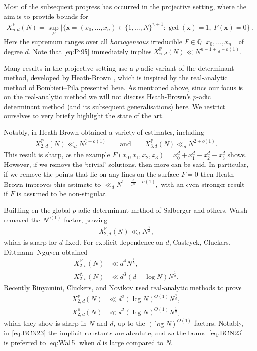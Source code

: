 \documentclass[12pt]{amsart}
\newcommand{\1}{{\mathbf 1}}
\theoremstyle{remark}
\theoremstyle{definition}
\begin{document}
Most of the subsequent progress has occurred in the projective setting, where the aim is to provide bounds for
\begin{align*}
X_{n,d}^{\mathbb{P}}(N) = \sup_{F}\lvert \{ \mathbf{x}=(x_0,\ldots,x_n)\in \{1,\ldots,N\}^{n+1} :  \gcd(\mathbf{x})=1, \ F(\mathbf{x})=0 \}\rvert.
\end{align*}
Here the supremum ranges over all \emph{homogeneous} irreducible $F\in \mathbb{Q}[x_0,\ldots,x_n]$ of degree $d$. Note that \eqref{eq:Pi95} immediately implies $X_{n,d}^{\mathbb{P}}(N) \ll N^{n-1+\frac{1}{d}+o(1)}$. 

Many results in the projective setting use a $p$-adic variant of the determinant method, developed by Heath-Brown \cite{HB02}, which is inspired by the real-analytic method of Bombieri--Pila presented here. As mentioned above, since our focus is on the real-analytic method we will not discuss Heath-Brown's $p$-adic determinant method (and its subsequent generalisations) here. We restrict ourselves to very briefly highlight the state of the art.


Notably, in \cite{HB02} Heath-Brown obtained a variety of estimates, including
\begin{align*}
X_{2,d}^{\mathbb{P}}(N) \ll_d N^{\frac{2}{d}+o(1)} 
\qquad \text{and}\qquad
X_{3,d}^{\mathbb{P}}(N) \ll_d N^{2+o(1)}.
\end{align*}
This result is sharp, as the example $F(x_0,x_1,x_2,x_3)=x_0^d+x_1^d-x_2^d-x_3^d$ shows. However, if we remove the `trivial' solutions, then more can be said. In particular, if we remove the points that lie on any lines on the surface $F=0$ then Heath-Brown improves this estimate to
$\ll_d N^{1+\frac{3}{\sqrt{d}}+o(1)},$
with an even stronger result if $F$ is assumed to be non-singular.



Building on the global $p$-adic determinant method of Salberger \cite{Sa23} and others, Walsh \cite{Wa15} removed the $N^{o(1)}$ factor, proving
\begin{align}\label{eq:Wa15}
X_{2,d}^{\mathbb{P}}(N) \ll_d N^{\frac{2}{d}},
\end{align}
which is sharp for $d$ fixed.
For explicit dependence on $d$, Castryck, Cluckers, Dittmann, Nguyen \cite{CCDN20} obtained
\begin{align}
X_{2,d}^{\mathbb{P}}(N) &\ll d^4 N^{\frac{2}{d}},\\
X_{2,d}^{\mathbb{A}}(N) &\ll d^3(d + \log N) N^{\frac{1}{d}} \nonumber.
\end{align}
Recently Binyamini, Cluckers, and Novikov \cite{BCN23} used real-analytic methods to prove
\begin{align}\label{eq:BCN23}
X_{2,d}^{\mathbb{P}}(N) &\ll d^2 (\log N)^{O(1)} N^{\frac{2}{d}},\\
X_{2,d}^{\mathbb{A}}(N) &\ll d^2 (\log N)^{O(1)} N^{\frac{1}{d}} \nonumber,
\end{align}
which they show is sharp in $N$ and $d$, up to the $(\log N)^{O(1)}$ factors. Notably, in \eqref{eq:BCN23} the implicit constants are absolute, and so the bound \eqref{eq:BCN23} is preferred to \eqref{eq:Wa15} when $d$ is large compared to $N$.
\end{document}
